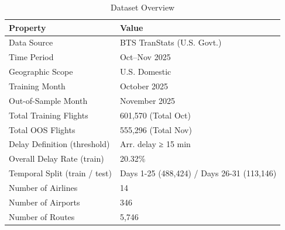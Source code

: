 \begin{table}[ht]
\centering
\caption{Dataset Overview}
\label{tab:dataset}
\begin{tabular}{ll}
\hline
Property & Value \\
\hline
Data Source & BTS TranStats (U.S. Govt.) \\
Time Period & Oct–Nov 2025 \\
Geographic Scope & U.S. Domestic \\
Training Month & October 2025 \\
Out-of-Sample Month & November 2025 \\
Total Training Flights & 601,570 (Total Oct) \\
Total OOS Flights & 555,296 (Total Nov) \\
Delay Definition (threshold) & Arr. delay ≥ 15 min \\
Overall Delay Rate (train) & 20.32\% \\
Temporal Split (train / test) & Days 1-25 (488,424) / Days 26-31 (113,146) \\
Number of Airlines & 14 \\
Number of Airports & 346 \\
Number of Routes & 5,746 \\
\hline
\end{tabular}
\end{table}